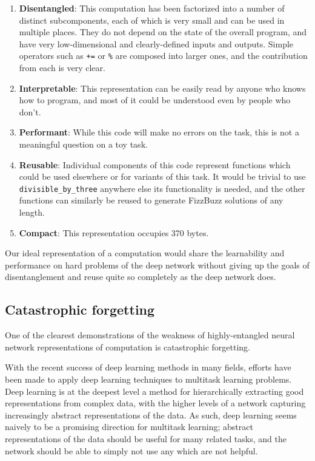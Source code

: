 \documentclass[12pt,twoside]{mitthesis}
\begin{document}
\begin{enumerate}
\def\labelenumi{\arabic{enumi}.}
\item
  \textbf{Disentangled}: This computation has been factorized into a
  number of distinct subcomponents, each of which is very small and can
  be used in multiple places. They do not depend on the state of the
  overall program, and have very low-dimensional and clearly-defined
  inputs and outputs. Simple operators such as \texttt{+=} or
  \texttt{\%} are composed into larger ones, and the contribution from
  each is very clear.
\item
  \textbf{Interpretable}: This representation can be easily read by
  anyone who knows how to program, and most of it could be understood
  even by people who don't.
\item
  \textbf{Performant}: While this code will make no errors on the task,
  this is not a meaningful question on a toy task.
\item
  \textbf{Reusable}: Individual components of this code represent
  functions which could be used elsewhere or for variants of this task.
  It would be trivial to use \texttt{divisible\_by\_three} anywhere else
  its functionality is needed, and the other functions can similarly be
  reused to generate FizzBuzz solutions of any length.
\item
  \textbf{Compact}: This representation occupies 370 bytes.
\end{enumerate}

Our ideal representation of a computation would share the learnability
and performance on hard problems of the deep network without giving up
the goals of disentanglement and reuse quite so completely as the deep
network does.

\subsection{Catastrophic forgetting}\label{catastrophic-forgetting}

One of the clearest demonstrations of the weakness of highly-entangled
neural network representations of computation is catastrophic
forgetting.

With the recent success of deep learning methods in many fields, efforts
have been made to apply deep learning techniques to multitask learning
problems. Deep learning is at the deepest level a method for
hierarchically extracting good representations from complex data, with
the higher levels of a network capturing increasingly abstract
representations of the data. As such, deep learning seems naively to be
a promising direction for multitask learning; abstract representations
of the data should be useful for many related tasks, and the network
should be able to simply not use any which are not helpful.
\end{document}
